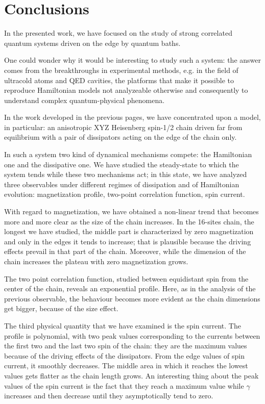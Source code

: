 \chapter*{Conclusions}

\label{Conclusions}

In the presented work, we have focused on the study of strong correlated quantum systems driven on the edge by quantum baths. %

One could wonder why it would be interesting to study such a system: the answer comes from the breakthroughs in  experimental methods, e.g. in the field of ultracold atoms and QED cavities, the platforms that make it possible to reproduce Hamiltonian models not analyzeable otherwise and consequently to understand complex quantum-physical phenomena. 

In the work developed in the previous pages, we have concentrated upon a model, in particular: an anisotropic XYZ Heisenberg spin-1/2 chain driven far from equilibrium with a pair of dissipators acting on the edge of the chain only.

In such a system two kind of dynamical mechanisms compete: the Hamiltonian one and the dissipative one. We have studied the steady-state to which the system tends while these two mechanisms act; in this state, we have analyzed three observables under different regimes of dissipation and of Hamiltonian evolution: magnetization profile, two-point correlation function, spin current.

With regard to magnetization, we have obtained a non-linear trend that becomes more and more clear as the size of the chain increases. In the 16-sites chain, the longest we have studied, the middle part is characterized by zero magnetization and only in the edges it tends to increase; that is plausible because the driving effects prevail in that part of the chain. Moreover, while the dimension of the chain increases the plateau with zero magnetization grows. 

The two point correlation function, studied between equidistant spin from the center of the chain, reveals an exponential profile. Here, as in the analysis of the previous observable, the behaviour becomes more evident as the chain dimensions get bigger, because of the size effect.

The third physical quantity that we have examined is the spin current. The profile is polynomial, with two peak values corresponding to the currents between the first two and the last two spin of the chain: they are the maximum values because of the driving effects of the dissipators. From the edge values of spin current, it smoothly decreases. The middle area in which it reaches the lowest values gets flatter as the chain length grows. An interesting thing about the peak values of the spin current is the fact that they reach a maximum value while $\gamma$ increases and then decrease until they  asymptotically tend to zero.

